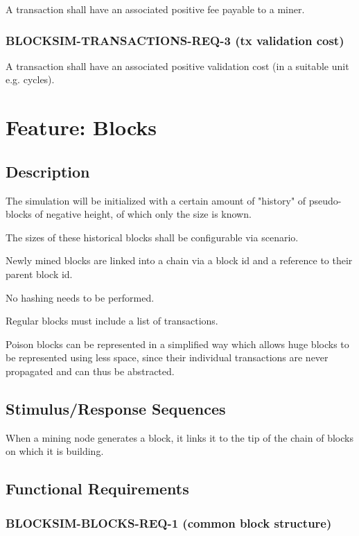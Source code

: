 \documentclass{scrreprt}
\begin{document}
        A transaction shall have an associated positive fee payable to a miner.

      \subsubsection{BLOCKSIM-TRANSACTIONS-REQ-3 (tx validation cost)}

        A transaction shall have an associated positive validation cost (in a
        suitable unit e.g. cycles).

  \section{Feature: Blocks}

    \subsection{Description}

      The simulation will be initialized with a certain amount of "history" of
      pseudo-blocks of negative height, of which only the size is known.

      The sizes of these historical blocks shall be configurable via scenario.

      Newly mined blocks are linked into a chain via a block id and a reference
      to their parent block id.

      No hashing needs to be performed.

      Regular blocks must include a list of transactions.

      Poison blocks can be represented in a simplified way which allows huge
      blocks to be represented using less space, since their individual
      transactions are never propagated and can thus be abstracted.

    \subsection{Stimulus/Response Sequences}

      When a mining node generates a block, it links it to the tip of the chain
      of blocks on which it is building.

    \subsection{Functional Requirements}

      \subsubsection{BLOCKSIM-BLOCKS-REQ-1 (common block structure)}
\end{document}
